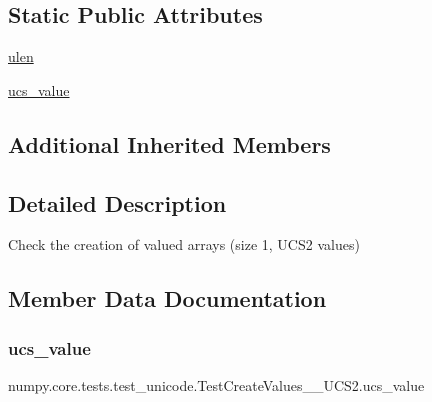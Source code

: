 \subsection*{Static Public Attributes}
\begin{DoxyCompactItemize}
\item 
\hyperlink{classnumpy_1_1core_1_1tests_1_1test__unicode_1_1TestCreateValues__1__UCS2_adaf76c03756008172d221f24a13ab0dd}{ulen}
\item 
\hyperlink{classnumpy_1_1core_1_1tests_1_1test__unicode_1_1TestCreateValues__1__UCS2_a4f955e0bc14a601523cdc69482ff11a9}{ucs\+\_\+value}
\end{DoxyCompactItemize}
\subsection*{Additional Inherited Members}


\subsection{Detailed Description}
\begin{DoxyVerb}Check the creation of valued arrays (size 1, UCS2 values)\end{DoxyVerb}
 

\subsection{Member Data Documentation}
\mbox{\label{classnumpy_1_1core_1_1tests_1_1test__unicode_1_1TestCreateValues__1__UCS2_a4f955e0bc14a601523cdc69482ff11a9}} 
\subsubsection{\texorpdfstring{ucs\+\_\+value}{ucs\_value}}
{\footnotesize\ttfamily numpy.\+core.\+tests.\+test\+\_\+unicode.\+Test\+Create\+Values\+\_\+\_\+\+U\+C\+S2.\+ucs\+\_\+value\hspace{0.3cm}{\ttfamily [static]}}

